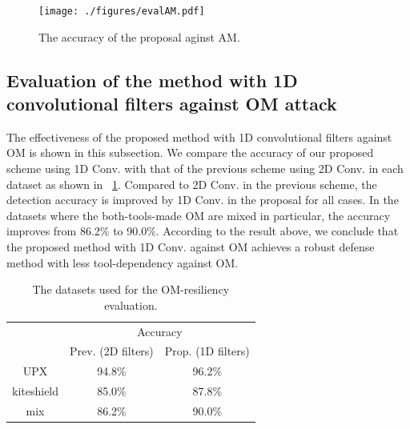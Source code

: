 \documentclass{ieeeaccess}
\begin{document}
\begin{figure}[h]
 \centering
 \texttt{[image: ./figures/evalAM.pdf]}
 \caption{The accuracy of the proposal aginst AM.} 
 \label{fig:evalAM}
\end{figure}

\subsection{Evaluation of the method with 1D convolutional filters against OM attack}
The effectiveness of the proposed method with 1D convolutional filters against OM is shown in this subsection.
We compare the accuracy of our proposed scheme using 1D Conv. with that of the previous scheme using 2D Conv. in each dataset as shown in \tablename~\ref{tab:evalOM}.
Compared to 2D Conv. in the previous scheme, the detection accuracy is improved by 1D Conv. in the proposal for all cases.
In the datasets where the both-tools-made OM are mixed in particular, the accuracy improves from 86.2\% to 90.0\%.
According to the result above, we conclude that the proposed method with 1D Conv. against OM achieves a robust defense method with less tool-dependency against OM.
\begin{table}[h]
  \begin{center}
    \caption{The datasets used for the OM-resiliency evaluation.}
    \label{tab:evalOM} 
    \begin{tabular}{|c|c|c|} \hline
      \multirow{2}{*}{\hfill  \hfill} & \multicolumn{2}{c|}{Accuracy}  \\ \cline{2-3} 
					     & Prev. (2D filters) & Prop. (1D filters) \\ \hline \hline
      UPX & 94.8\% & 96.2\% \\ \cline{1-3} 
      kiteshield & 85.0\% & 87.8\% \\ \cline{1-3} 
      mix & 86.2\% & 90.0\% \\ \cline{1-3} 
  \end{tabular}
  \end{center}
\end{table}
\end{document}
